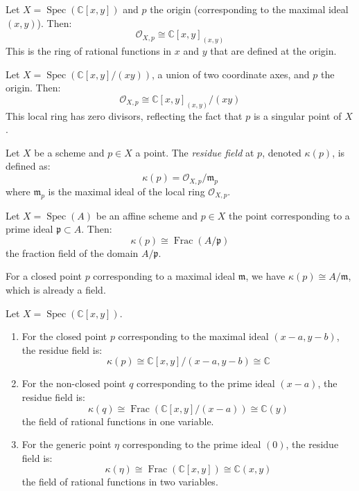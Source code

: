 \documentclass[12pt]{article}
\begin{document}
\begin{example}
    Let $X = \operatorname{Spec}(\mathbb{C}[x,y])$ and $p$ the origin (corresponding to the maximal ideal $(x,y)$). Then:
    \[
        \mathcal{O}_{X,p} \cong \mathbb{C}[x,y]_{(x,y)}
    \]
    This is the ring of rational functions in $x$ and $y$ that are defined at the origin.
\end{example}

\begin{example}
    Let $X = \operatorname{Spec}(\mathbb{C}[x,y]/(xy))$, a union of two coordinate axes, and $p$ the origin. Then:
    \[
        \mathcal{O}_{X,p} \cong \mathbb{C}[x,y]_{(x,y)}/(xy)
    \]
    This local ring has zero divisors, reflecting the fact that $p$ is a singular point of $X$.
\end{example}

\begin{definition}
    Let $X$ be a scheme and $p \in X$ a point. The \textit{residue field} at $p$, denoted $\kappa(p)$, is defined as:
    \[
        \kappa(p) = \mathcal{O}_{X,p}/\mathfrak{m}_p
    \]
    where $\mathfrak{m}_p$ is the maximal ideal of the local ring $\mathcal{O}_{X,p}$.
\end{definition}

\begin{proposition}
    Let $X = \operatorname{Spec}(A)$ be an affine scheme and $p \in X$ the point corresponding to a prime ideal $\mathfrak{p} \subset A$. Then:
    \[
        \kappa(p) \cong \operatorname{Frac}(A/\mathfrak{p})
    \]
    the fraction field of the domain $A/\mathfrak{p}$.
\end{proposition}

\begin{remark}
    For a closed point $p$ corresponding to a maximal ideal $\mathfrak{m}$, we have $\kappa(p) \cong A/\mathfrak{m}$, which is already a field.
\end{remark}

\begin{example}
    Let $X = \operatorname{Spec}(\mathbb{C}[x,y])$.
    \begin{enumerate}
        \item For the closed point $p$ corresponding to the maximal ideal $(x-a, y-b)$, the residue field is:
              \[
                  \kappa(p) \cong \mathbb{C}[x,y]/(x-a, y-b) \cong \mathbb{C}
              \]

        \item For the non-closed point $q$ corresponding to the prime ideal $(x-a)$, the residue field is:
              \[
                  \kappa(q) \cong \operatorname{Frac}(\mathbb{C}[x,y]/(x-a)) \cong \mathbb{C}(y)
              \]
              the field of rational functions in one variable.

        \item For the generic point $\eta$ corresponding to the prime ideal $(0)$, the residue field is:
              \[
                  \kappa(\eta) \cong \operatorname{Frac}(\mathbb{C}[x,y]) \cong \mathbb{C}(x,y)
              \]
              the field of rational functions in two variables.
    \end{enumerate}
\end{example}
\end{document}
